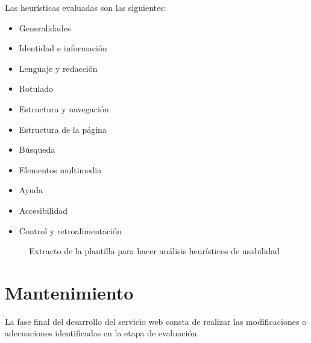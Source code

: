 Las heur\'isticas evaluadas son las siguientes:

\begin{itemize}
    \item Generalidades
    \item Identidad e informaci\'on
    \item Lenguaje y redacci\'on
    \item Rotulado
    \item Estructura y navegaci\'on
    \item Estructura de la p\'agina
    \item B\'usqueda
    \item Elementos multimedia
    \item Ayuda
    \item Accesibilidad
    \item Control y retroalimentaci\'on
\end{itemize}

\begin{figure}[!ht]
	\centering
    \caption{Extracto de la plantilla para hacer an\'alisis heur\'isticos de usabilidad}
    \label{extractoPlantilla}
\end{figure}

\section{Mantenimiento}

La fase final del desarrollo del servicio web consta de realizar las modificaciones o adecuaciones identificadas en la etapa de evaluaci\'on.
